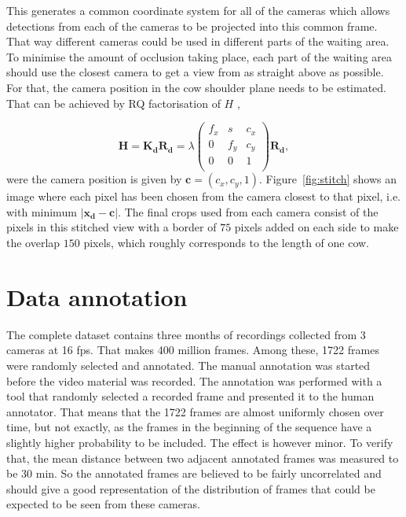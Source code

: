 \documentclass{cta-author}
\begin{document}
This generates a common coordinate system for all of the cameras which allows detections from each of the
cameras to be projected into this common frame. That way different cameras could be used in different parts
of the waiting area. To minimise the amount of occlusion taking place, each part of the waiting area should
use the closest camera to get a view from as straight above as possible. For that, the camera position in the
cow shoulder plane needs to be estimated. That can be achieved by RQ factorisation of $H$ \cite{Hartley2004},

\begin{equation}
\bm H = \bm {K_d} \bm {R_d} =
    \lambda
	\left(
	\begin{array}{ccc}
		f_x & s & c_x  \\
		0 & f_y & c_y  \\
		0 & 0 & 1  \\
	\end{array}
	\right)
	\bm {R_d} ,
\end{equation}
were the camera position is given by $\bm c = \left(c_x, c_y, 1\right)$. Figure~\ref{fig:stitch} shows an
image where each pixel has been chosen from the camera closest to that pixel, i.e. with  minimum $\left| \bm
{x_d} - \bm c \right|$. The final crops used from each camera consist of the pixels in this stitched view
with a border of $75$ pixels added on each side to make the overlap $150$ pixels, which roughly corresponds
to the length of one cow.


\section{Data annotation}

The complete dataset contains three months of recordings collected from 3 cameras at 16 fps. That makes 400
million frames. Among these, 1722 frames were randomly selected and annotated. The manual annotation was started
before the video material was recorded. The annotation was performed with a tool that randomly selected a recorded
frame and presented it to the human annotator. That means that the 1722 frames are almost uniformly chosen over time, but not exactly, as the frames in the beginning of the sequence have a slightly higher probability to
be included. The effect is however minor. To verify that,
the mean distance between two adjacent annotated frames was measured to be 30 min. So the annotated frames are
believed to be fairly uncorrelated and should give a good representation of the distribution of frames that
could be expected to be seen from these cameras.
\end{document}
